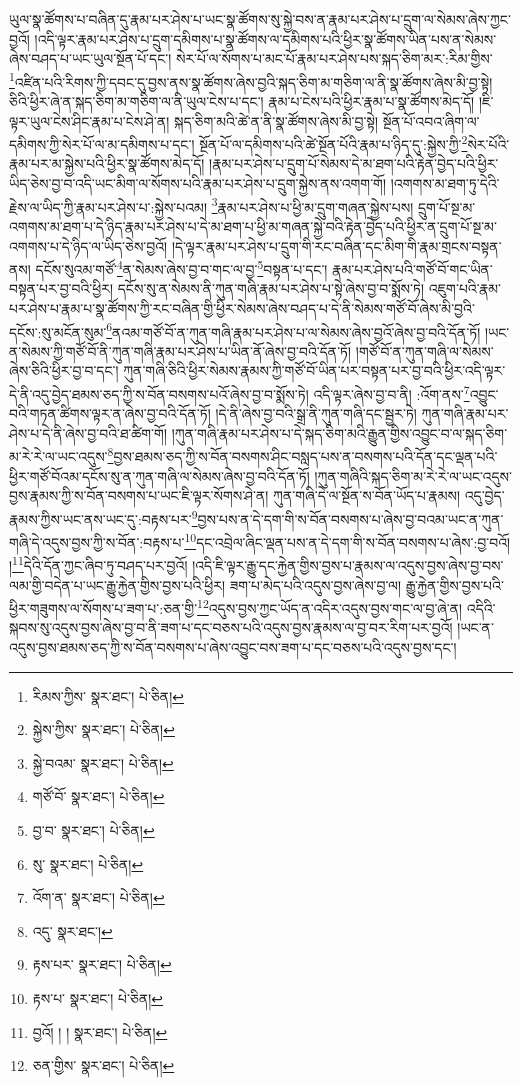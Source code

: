 ཡུལ་སྣ་ཚོགས་པ་བཞིན་དུ་རྣམ་པར་ཤེས་པ་ཡང་སྣ་ཚོགས་སུ་སྐྱེ་བས་ན་རྣམ་པར་ཤེས་པ་དྲུག་ལ་སེམས་ཞེས་ཀྱང་བྱའོ། །འདི་ལྟར་རྣམ་པར་ཤེས་པ་དྲུག་དམིགས་པ་སྣ་ཚོགས་ལ་དམིགས་པའི་ཕྱིར་སྣ་ཚོགས་ཡིན་པས་ན་སེམས་ཞེས་བཤད་པ་ཡང་ཡུལ་སྔོན་པོ་དང་། སེར་པོ་ལ་སོགས་པ་མང་པོ་རྣམ་པར་ཤེས་པས་སྐད་ཅིག་མར་:རིམ་གྱིས་\footnote{རིམས་ཀྱིས་  སྣར་ཐང་།  པེ་ཅིན། }འཛིན་པའི་རིགས་ཀྱི་དབང་དུ་བྱས་ནས་སྣ་ཚོགས་ཞེས་བྱའི་སྐད་ཅིག་མ་གཅིག་ལ་ནི་སྣ་ཚོགས་ཞེས་མི་བྱ་སྟེ། ཅིའི་ཕྱིར་ཞེ་ན་སྐད་ཅིག་མ་གཅིག་ལ་ནི་ཡུལ་ངེས་པ་དང་། རྣམ་པ་ངེས་པའི་ཕྱིར་རྣམ་པ་སྣ་ཚོགས་མེད་དོ། །ཇི་ལྟར་ཡུལ་ངེས་ཤིང་རྣམ་པ་ངེས་ཤེ་ན། སྐད་ཅིག་མའི་ཚེ་ན་ནི་སྣ་ཚོགས་ཞེས་མི་བྱ་སྟེ། སྔོན་པོ་འབའ་ཞིག་ལ་དམིགས་ཀྱི་སེར་པོ་ལ་མ་དམིགས་པ་དང་། སྔོན་པོ་ལ་དམིགས་པའི་ཚེ་སྔོན་པོའི་རྣམ་པ་ཉིད་དུ་:སྐྱེས་ཀྱི་\footnote{སྐྱེས་ཀྱིས་  སྣར་ཐང་།  པེ་ཅིན། }སེར་པོའི་རྣམ་པར་མ་སྐྱེས་པའི་ཕྱིར་སྣ་ཚོགས་མེད་དོ། །རྣམ་པར་ཤེས་པ་དྲུག་པོ་སེམས་དེ་མ་ཐག་པའི་རྟེན་བྱེད་པའི་ཕྱིར་ཡིད་ཅེས་བྱ་བ་འདི་ཡང་མིག་ལ་སོགས་པའི་རྣམ་པར་ཤེས་པ་དྲུག་སྐྱེས་ནས་འགག་གོ། །འགགས་མ་ཐག་ཏུ་དེའི་རྗེས་ལ་ཡིད་ཀྱི་རྣམ་པར་ཤེས་པ་:སྐྱེས་པའམ། \footnote{སྐྱེ་བའམ་  སྣར་ཐང་།  པེ་ཅིན། }རྣམ་པར་ཤེས་པ་ཕྱི་མ་དྲུག་གཞན་སྐྱེས་པས། དྲུག་པོ་སྔ་མ་འགགས་མ་ཐག་པ་དེ་ཉིད་རྣམ་པར་ཤེས་པ་དེ་མ་ཐག་པ་ཕྱི་མ་གཞན་སྐྱེ་བའི་རྟེན་བྱེད་པའི་ཕྱིར་ན་དྲུག་པོ་སྔ་མ་འགགས་པ་དེ་ཉིད་ལ་ཡིད་ཅེས་བྱའོ། །དེ་ལྟར་རྣམ་པར་ཤེས་པ་དྲུག་གི་རང་བཞིན་དང་མིག་གི་རྣམ་གྲངས་བསྟན་ནས། དངོས་སུའམ་གཙོ་\footnote{གཙོ་བོ་  སྣར་ཐང་།  པེ་ཅིན། }ན་སེམས་ཞེས་བྱ་བ་གང་ལ་བྱ་\footnote{བྱ་བ་  སྣར་ཐང་།  པེ་ཅིན། }བསྟན་པ་དང་། རྣམ་པར་ཤེས་པའི་གཙོ་བོ་གང་ཡིན་བསྟན་པར་བྱ་བའི་ཕྱིར། དངོས་སུ་ན་སེམས་ནི་ཀུན་གཞི་རྣམ་པར་ཤེས་པ་སྟེ་ཞེས་བྱ་བ་སྨོས་ཏེ། འཇུག་པའི་རྣམ་པར་ཤེས་པ་རྣམ་པ་སྣ་ཚོགས་ཀྱི་རང་བཞིན་གྱི་ཕྱིར་སེམས་ཞེས་བཤད་པ་དེ་ནི་སེམས་གཙོ་བོ་ཞེས་མི་བྱའི་དངོས་:སུ་མངོན་སུམ་\footnote{སུ་  སྣར་ཐང་།  པེ་ཅིན། }ནའམ་གཙོ་བོ་ན་ཀུན་གཞི་རྣམ་པར་ཤེས་པ་ལ་སེམས་ཞེས་བྱའོ་ཞེས་བྱ་བའི་དོན་ཏོ། །ཡང་ན་སེམས་ཀྱི་གཙོ་བོ་ནི་ཀུན་གཞི་རྣམ་པར་ཤེས་པ་ཡིན་ནོ་ཞེས་བྱ་བའི་དོན་ཏོ། །གཙོ་བོ་ན་ཀུན་གཞི་ལ་སེམས་ཞེས་ཅིའི་ཕྱིར་བྱ་བ་དང་། ཀུན་གཞི་ཅིའི་ཕྱིར་སེམས་རྣམས་ཀྱི་གཙོ་བོ་ཡིན་པར་བསྟན་པར་བྱ་བའི་ཕྱིར་འདི་ལྟར་དེ་ནི་འདུ་བྱེད་ཐམས་ཅད་ཀྱི་ས་བོན་བསགས་པའོ་ཞེས་བྱ་བ་སྨོས་ཏེ། འདི་ལྟར་ཞེས་བྱ་བ་ནི། :འོག་ནས་\footnote{འོག་ན་  སྣར་ཐང་།  པེ་ཅིན། }འབྱུང་བའི་གཏན་ཚིགས་ལྟར་ན་ཞེས་བྱ་བའི་དོན་ཏོ། །དེ་ནི་ཞེས་བྱ་བའི་སྒྲ་ནི་ཀུན་གཞི་དང་སྦྱར་ཏེ། ཀུན་གཞི་རྣམ་པར་ཤེས་པ་དེ་ནི་ཞེས་བྱ་བའི་ཐ་ཚིག་གོ། །ཀུན་གཞི་རྣམ་པར་ཤེས་པ་དེ་སྐད་ཅིག་མའི་རྒྱུན་གྱིས་འབྱུང་བ་ལ་སྐད་ཅིག་མ་རེ་རེ་ལ་ཡང་འདུས་\footnote{འདུ་  སྣར་ཐང་། }བྱས་ཐམས་ཅད་ཀྱི་ས་བོན་བསགས་ཤིང་བསླད་པས་ན་བསགས་པའི་དོན་དང་ལྡན་པའི་ཕྱིར་གཙོ་བོའམ་དངོས་སུ་ན་ཀུན་གཞི་ལ་སེམས་ཞེས་བྱ་བའི་དོན་ཏོ། །ཀུན་གཞིའི་སྐད་ཅིག་མ་རེ་རེ་ལ་ཡང་འདུས་བྱས་རྣམས་ཀྱི་ས་བོན་བསགས་པ་ཡང་ཇི་ལྟར་སོགས་ཤེ་ན། ཀུན་གཞི་དེ་ལ་སྔོན་ས་བོན་ཡོད་པ་རྣམས། འདུ་བྱེད་རྣམས་ཀྱིས་ཡང་ནས་ཡང་དུ་:བརྟས་པར་\footnote{རྟས་པར་  སྣར་ཐང་།  པེ་ཅིན། }བྱས་པས་ན་དེ་དག་གི་ས་བོན་བསགས་པ་ཞེས་བྱ་བའམ་ཡང་ན་ཀུན་གཞི་དེ་འདུས་བྱས་ཀྱི་ས་བོན་:བརྟས་པ་\footnote{རྟས་པ་  སྣར་ཐང་།  པེ་ཅིན། }དང་འབྲེལ་ཞིང་ལྡན་པས་ན་དེ་དག་གི་ས་བོན་བསགས་པ་ཞེས་:བྱ་བའོ། །\footnote{བྱའོ། ། །  སྣར་ཐང་།  པེ་ཅིན། }དེའི་དོན་ཀྱང་ཞིབ་ཏུ་བཤད་པར་བྱའོ། །འདི་ཇི་ལྟར་རྒྱུ་དང་རྐྱེན་གྱིས་བྱས་པ་རྣམས་ལ་འདུས་བྱས་ཞེས་བྱ་བས་ལམ་གྱི་བདེན་པ་ཡང་རྒྱུ་རྐྱེན་གྱིས་བྱས་པའི་ཕྱིར། ཟག་པ་མེད་པའི་འདུས་བྱས་ཞེས་བྱ་ལ། རྒྱུ་རྐྱེན་གྱིས་བྱས་པའི་ཕྱིར་གཟུགས་ལ་སོགས་པ་ཟག་པ་:ཅན་གྱི་\footnote{ཅན་གྱིས་  སྣར་ཐང་།  པེ་ཅིན། }འདུས་བྱས་ཀྱང་ཡོད་ན་འདིར་འདུས་བྱས་གང་ལ་བྱ་ཞེ་ན། འདིའི་སྐབས་སུ་འདུས་བྱས་ཞེས་བྱ་བ་ནི་ཟག་པ་དང་བཅས་པའི་འདུས་བྱས་རྣམས་ལ་བྱ་བར་རིག་པར་བྱའོ། །ཡང་ན་འདུས་བྱས་ཐམས་ཅད་ཀྱི་ས་བོན་བསགས་པ་ཞེས་འབྱུང་བས་ཟག་པ་དང་བཅས་པའི་འདུས་བྱས་དང་། 